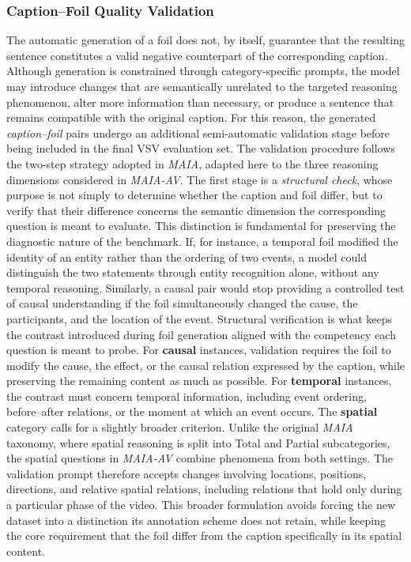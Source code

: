 \subsubsection*{Caption--Foil Quality Validation}
The automatic generation of a foil does not, by itself, guarantee that the resulting sentence constitutes a valid negative counterpart of the corresponding caption. Although generation is constrained through category-specific prompts, the model may introduce changes that are semantically unrelated to the targeted reasoning phenomenon, alter more information than necessary, or produce a sentence that remains compatible with the original caption. For this reason, the generated \textit{caption--foil} pairs undergo an additional semi-automatic validation stage before being included in the final \ac{VSV} evaluation set.
The validation procedure follows the two-step strategy adopted in \textit{MAIA}, adapted here to the three reasoning dimensions considered in \textit{MAIA-AV}. The first stage is a \textit{structural check}, whose purpose is not simply to determine whether the caption and foil differ, but to verify that their difference concerns the semantic dimension the corresponding question is meant to evaluate. This distinction is fundamental for preserving the diagnostic nature of the benchmark. If, for instance, a temporal foil modified the identity of an entity rather than the ordering of two events, a model could distinguish the two statements through entity recognition alone, without any temporal reasoning. Similarly, a causal pair would stop providing a controlled test of causal understanding if the foil simultaneously changed the cause, the participants, and the location of the event. Structural verification is what keeps the contrast introduced during foil generation aligned with the competency each question is meant to probe.
For \textbf{causal} instances, validation requires the foil to modify the cause, the effect, or the causal relation expressed by the caption, while preserving the remaining content as much as possible. For \textbf{temporal} instances, the contrast must concern temporal information, including event ordering, before--after relations, or the moment at which an event occurs. The \textbf{spatial} category calls for a slightly broader criterion. Unlike the original \textit{MAIA} taxonomy, where spatial reasoning is split into Total and Partial subcategories, the spatial questions in \textit{MAIA-AV} combine phenomena from both settings. The validation prompt therefore accepts changes involving locations, positions, directions, and relative spatial relations, including relations that hold only during a particular phase of the video. This broader formulation avoids forcing the new dataset into a distinction its annotation scheme does not retain, while keeping the core requirement that the foil differ from the caption specifically in its spatial content.
